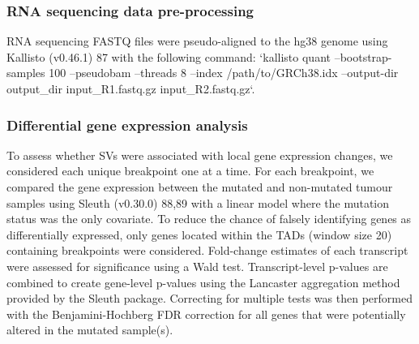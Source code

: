 \subsubsection{RNA sequencing data pre-processing}

RNA sequencing FASTQ files were pseudo-aligned to the hg38 genome using Kallisto (v0.46.1) 87 with the following command: `kallisto quant --bootstrap-samples 100 --pseudobam --threads 8 --index /path/to/GRCh38.idx --output-dir {output_dir} {input_R1.fastq.gz} {input_R2.fastq.gz}`.

\subsubsection{Differential gene expression analysis}

To assess whether SVs were associated with local gene expression changes, we considered each unique breakpoint one at a time.
For each breakpoint, we compared the gene expression between the mutated and non-mutated tumour samples using Sleuth (v0.30.0) 88,89 with a linear model where the mutation status was the only covariate.
To reduce the chance of falsely identifying genes as differentially expressed, only genes located within the TADs (window size 20) containing breakpoints were considered.
Fold-change estimates of each transcript were assessed for significance using a Wald test.
Transcript-level p-values are combined to create gene-level p-values using the Lancaster aggregation method provided by the Sleuth package.
Correcting for multiple tests was then performed with the Benjamini-Hochberg FDR correction for all genes that were potentially altered in the mutated sample(s).
